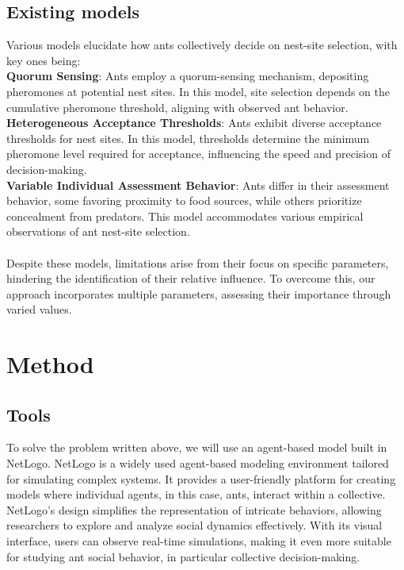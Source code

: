\documentclass{article}
\begin{document}
\subsection{Existing models}
Various models elucidate how ants collectively decide on nest-site selection, with key ones being:\\
\textbf{Quorum Sensing}: Ants employ a quorum-sensing mechanism, depositing pheromones at potential nest sites. In this model, site selection depends on the cumulative pheromone threshold, aligning with observed ant behavior.\cite{quorum_sensing_recruitment}\\
\textbf{Heterogeneous Acceptance Thresholds}: Ants exhibit diverse acceptance thresholds for nest sites. In this model, thresholds determine the minimum pheromone level required for acceptance, influencing the speed and precision of decision-making. \cite{computational_model}\\
\textbf{Variable Individual Assessment Behavior}: Ants differ in their assessment behavior, some favoring proximity to food sources, while others prioritize concealment from predators. This model accommodates various empirical observations of ant nest-site selection. \cite{variability_individual_assessment}\\\\
Despite these models, limitations arise from their focus on specific parameters, hindering the identification of their relative influence. To overcome this, our approach incorporates multiple parameters, assessing their importance through varied values.

 

\section{Method}
\subsection{Tools}

To solve the problem written above, we will use an agent-based model built in NetLogo.
NetLogo is a widely used agent-based modeling environment tailored for simulating complex systems. It provides a user-friendly platform for creating models where individual agents, in this case, ants, interact within a collective. NetLogo's design simplifies the representation of intricate behaviors, allowing researchers to explore and analyze social dynamics effectively. With its visual interface, users can observe real-time simulations, making it even more suitable for studying ant social behavior, in particular collective decision-making.
\end{document}

